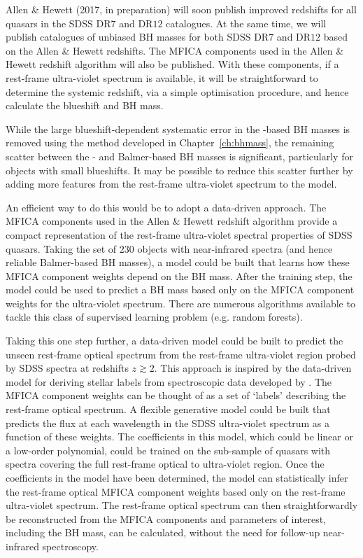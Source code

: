 Allen \& Hewett (2017, in preparation) will soon publish improved redshifts for all quasars in the SDSS DR$7$ and DR$12$ catalogues. 
At the same time, we will publish catalogues of unbiased BH masses for both SDSS DR$7$ and DR$12$ based on the Allen \& Hewett redshifts. 
The MFICA components used in the Allen \& Hewett redshift algorithm will also be published.
With these components, if a rest-frame ultra-violet spectrum is available, it will be straightforward to determine the systemic redshift, via a simple optimisation procedure, and hence calculate the  blueshift and BH mass. 

While the large  blueshift-dependent systematic error in the -based BH masses is removed using the method developed in Chapter~\ref{ch:bhmass}, the remaining scatter between the - and Balmer-based BH masses is significant, particularly for objects with small  blueshifts.
It may be possible to reduce this scatter further by adding more features from the rest-frame ultra-violet spectrum to the model. 

An efficient way to do this would be to adopt a data-driven approach. 
The MFICA components used in the Allen \& Hewett redshift algorithm provide a compact representation of the rest-frame ultra-violet spectral properties of SDSS quasars.  
Taking the set of $230$ objects with near-infrared spectra (and hence reliable Balmer-based BH masses), a model could be built that learns how these MFICA component weights depend on the BH mass. 
After the training step, the model could be used to predict a BH mass based only on the MFICA component weights for the ultra-violet spectrum.
There are numerous algorithms available to tackle this class of supervised learning problem (e.g. random forests). 

Taking this one step further, a data-driven model could be built to predict the unseen rest-frame optical spectrum from the rest-frame ultra-violet region probed by SDSS spectra at redshifts $z\gtrsim2$.
This approach is inspired by the data-driven model for deriving stellar labels from spectroscopic data developed by \citet{ness15}.
The MFICA component weights can be thought of as a set of `labels' describing the rest-frame optical spectrum. 
A flexible generative model could be built that predicts the flux at each wavelength in the SDSS ultra-violet spectrum as a function of these weights.
The coefficients in this model, which could be linear or a low-order polynomial, could be trained on the sub-sample of quasars with spectra covering the full rest-frame optical to ultra-violet region. 
Once the coefficients in the model have been determined, the model can statistically infer the rest-frame optical MFICA component weights based only on the rest-frame ultra-violet spectrum. 
The rest-frame optical spectrum can then straightforwardly be reconstructed from the MFICA components and parameters of interest, including the BH mass, can be calculated, without the need for follow-up near-infrared spectroscopy. 

